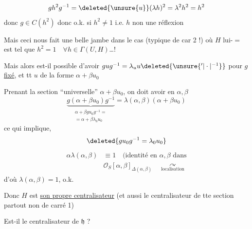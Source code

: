 \[
 gh^2g^{-1}=\deleted{\unsure{u}}(\lambda h)^2=\lambda^2h^2=h^2
\]
donc $g\in C(h^2)$ donc o.k. si $h^2\ne1$ i.e. $h$ non une réflexion

Mais ceci nous fait une belle jambe dans le cas (typique de car 2 !) où  $H$ lui-$=$ est tel que $h^2=1\quad\forall h\in\Gamma(U,H)$\ldots!

 Mais alors est-il possible d'avoir $gug^{-1}=\lambda_u u\deleted{\unsure{{}^{\prime}|\cdot|{}^{-1}}}$ \deleted{\(\forall\)} pour $g$ \uline{fixé}, et tt $u$  de la  forme $\alpha+\beta u_0$

Prenant la section ``universelle'' $\alpha+\beta u_0$, on doit avoir  en $\alpha,\beta$
\[
 \underbrace{g(\alpha+\beta u_0)g^{-1}}_{\begin{gathered}
 \alpha+\beta gu_0g^{-1}=\\[-2pt]
 =\alpha+\beta\lambda_0u_0
 \end{gathered}}
 =\lambda(\alpha,\beta)(\alpha+\beta u_0)
\]
ce qui implique, 
\[
 \deleted{gu_0g^{-1}=\lambda_0u_0}
\]
\[
\begin{aligned}
 \alpha\lambda(\alpha,\beta)&\equiv1 \quad\text{(identité en $\alpha,\beta$ dans}\\
 &\mathcal O_S[\alpha,\beta]_{\Delta(\alpha,\beta)}
 \quad\underset{\text{localisation}}{\curvearrowright}
\end{aligned}
\]
d'où $\lambda(\alpha,\beta)=1$, o.k.

Donc $H$ est \uline{son propre centralisateur} (et aussi le centralisateur de tte section partout non de carré 1)

Est-il le centralisateur de $\mathfrak h$ ?
